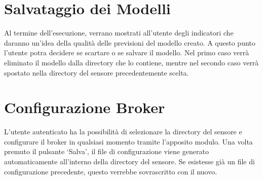\documentclass{rapportECL}
\begin{document}
\section{Salvataggio dei Modelli}
Al termine dell'esecuzione, verrano mostrati all'utente degli indicatori che daranno un'idea della qualità delle previsioni del modello creato.
A questo punto l'utente potra decidere se scartare o se salvare il modello. Nel primo caso verrà eliminato il modello dalla directory che lo contiene, mentre nel 
secondo caso verrà spostato nella directory del sensore precedentemente scelta.

\section{Configurazione Broker}
L'utente autenticato ha la possibilità di selezionare la directory del sensore e configurare il broker in qualsiasi momento tramite l'apposito modulo. 
Una volta premuto il pulsante `Salva', il file di configurazione viene generato automaticamente all'interno della directory del sensore. 
Se esistesse già un file di configurazione precedente, questo verrebbe sovrascritto con il nuovo.


\end{document}
